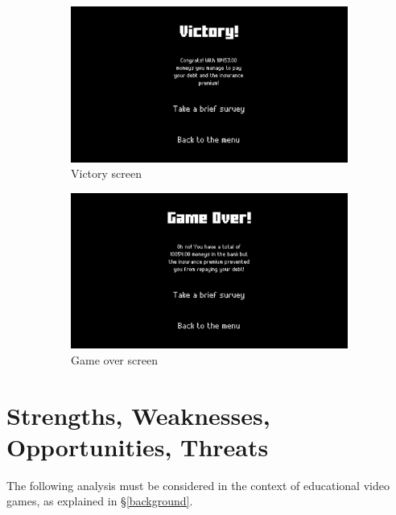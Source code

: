 \documentclass[a4paper,11pt]{article}
\begin{document}
\begin{figure}[p]
  \vspace{\baselineskip}
  \begin{subfigure}{0.475\textwidth}
    \centering
    \includegraphics[width=\textwidth]{figures/victory.png}
    \caption{Victory screen}\label{fig:victory}
  \end{subfigure}
  \hfill
  \begin{subfigure}{0.475\textwidth}
    \centering
    \includegraphics[width=\textwidth]{figures/game-over.png}
    \caption{Game over screen}\label{fig:game-over}
  \end{subfigure}

  \caption{}\label{fig:screens}
\end{figure}
  
\section{Strengths, Weaknesses, Opportunities, Threats}\label{swot}
The following analysis must be considered in the context of educational video games, as explained in \S\ref{background}.
\end{document}
